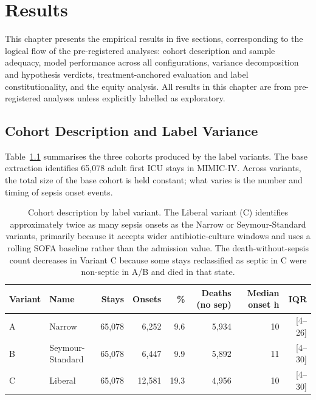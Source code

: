 \chapter{Results}
\label{ch:evaluation}

This chapter presents the empirical results in five sections, corresponding to
the logical flow of the pre-registered analyses: cohort description and sample
adequacy, model performance across all configurations, variance decomposition
and hypothesis verdicts, treatment-anchored evaluation and label constitutionality,
and the equity analysis. All results in this chapter are from pre-registered
analyses unless explicitly labelled as exploratory.

\section{Cohort Description and Label Variance}
\label{sec:cohort}

Table~\ref{tab:cohort} summarises the three cohorts produced by the label
variants. The base extraction identifies 65{,}078 adult first ICU stays in
MIMIC-IV. Across variants, the total size of the base cohort is held constant;
what varies is the number and timing of sepsis onset events.

\begin{table}[H]
  \centering
  \begin{tabularx}{\textwidth}{lXrrrrrr}
    \toprule
    \textbf{Variant} & \textbf{Name} & \textbf{Stays} & \textbf{Onsets}
      & \textbf{\%} & \textbf{Deaths (no sep)} & \textbf{Median onset h}
      & \textbf{IQR} \\
    \midrule
    A & Narrow           & 65{,}078 & 6{,}252  & 9.6  & 5{,}934 & 10 & [4--26] \\
    B & Seymour-Standard & 65{,}078 & 6{,}447  & 9.9  & 5{,}892 & 11 & [4--30] \\
    C & Liberal          & 65{,}078 & 12{,}581 & 19.3 & 4{,}956 & 10 & [4--30] \\
    \bottomrule
  \end{tabularx}
  \caption{Cohort description by label variant. The Liberal variant (C) identifies
  approximately twice as many sepsis onsets as the Narrow or Seymour-Standard
  variants, primarily because it accepts wider antibiotic-culture windows and uses
  a rolling SOFA baseline rather than the admission value. The death-without-sepsis
  count decreases in Variant C because some stays reclassified as septic in C were
  non-septic in A/B and died in that state.}
  \label{tab:cohort}
\end{table}

